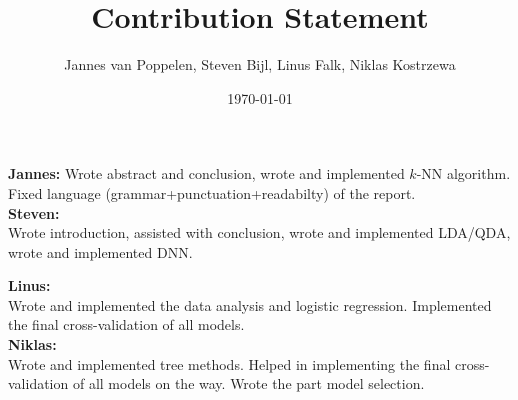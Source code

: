 \documentclass{article}
\title{Contribution Statement}
\author{Jannes van Poppelen, Steven Bijl, Linus Falk, Niklas Kostrzewa}
\date{\today}
\begin{document}
\maketitle

\textbf{Jannes:} Wrote abstract and conclusion, wrote and implemented $k$-NN algorithm. Fixed language (grammar+punctuation+readabilty) of the report.\\

\textbf{Steven:}\\
Wrote introduction, assisted with conclusion, wrote and implemented LDA/QDA, wrote and implemented DNN.

\textbf{Linus:}\\
Wrote and implemented the data analysis and logistic regression. Implemented the final cross-validation of all models. \\

\textbf{Niklas:}\\
Wrote and implemented tree methods. Helped in implementing the final cross-validation of all models on the way. 
Wrote the part model selection.
\end{document}
